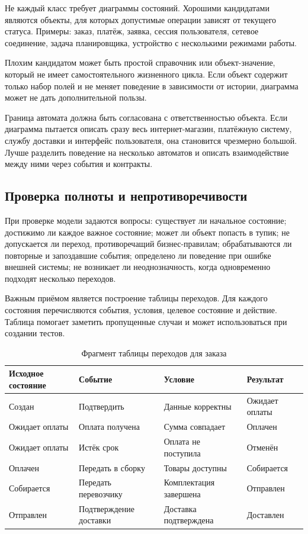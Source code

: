 \documentclass[essay,paper]{pmk-graduate}
\begin{document}
Не каждый класс требует диаграммы состояний. Хорошими кандидатами являются объекты, для которых допустимые операции зависят от текущего статуса. Примеры: заказ, платёж, заявка, сессия пользователя, сетевое соединение, задача планировщика, устройство с несколькими режимами работы.

Плохим кандидатом может быть простой справочник или объект-значение, который не имеет самостоятельного жизненного цикла. Если объект содержит только набор полей и не меняет поведение в зависимости от истории, диаграмма может не дать дополнительной пользы.

Граница автомата должна быть согласована с ответственностью объекта. Если диаграмма пытается описать сразу весь интернет-магазин, платёжную систему, службу доставки и интерфейс пользователя, она становится чрезмерно большой. Лучше разделить поведение на несколько автоматов и описать взаимодействие между ними через события и контракты.

\subsection{Проверка полноты и непротиворечивости}

При проверке модели задаются вопросы: существует ли начальное состояние; достижимо ли каждое важное состояние; может ли объект попасть в тупик; не допускается ли переход, противоречащий бизнес-правилам; обрабатываются ли повторные и запоздавшие события; определено ли поведение при ошибке внешней системы; не возникает ли неоднозначность, когда одновременно подходят несколько переходов.

Важным приёмом является построение таблицы переходов. Для каждого состояния перечисляются события, условия, целевое состояние и действие. Таблица помогает заметить пропущенные случаи и может использоваться при создании тестов.

\begin{table}[ht]
\centering
\caption{Фрагмент таблицы переходов для заказа}
\small
\begin{tabularx}{\textwidth}{|p{2.4cm}|p{2.6cm}|X|p{2.5cm}|}
\hline
\textbf{Исходное состояние} & \textbf{Событие} & \textbf{Условие} & \textbf{Результат} \\ \hline
Создан & Подтвердить & Данные корректны & Ожидает оплаты \\ \hline
Ожидает оплаты & Оплата получена & Сумма совпадает & Оплачен \\ \hline
Ожидает оплаты & Истёк срок & Оплата не поступила & Отменён \\ \hline
Оплачен & Передать в сборку & Товары доступны & Собирается \\ \hline
Собирается & Передать перевозчику & Комплектация завершена & Отправлен \\ \hline
Отправлен & Подтверждение доставки & Доставка подтверждена & Доставлен \\ \hline
\end{tabularx}
\normalsize
\end{table}
\end{document}
